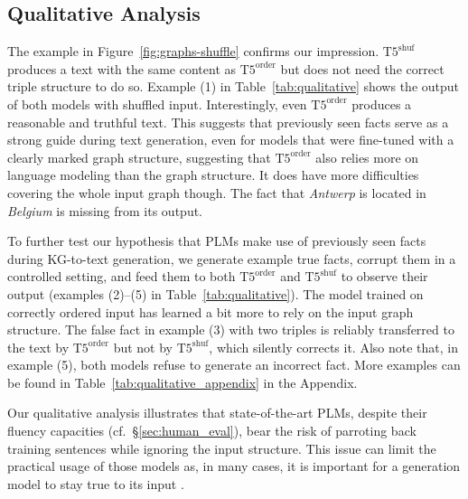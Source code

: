 \documentclass[11pt]{article}
\newcommand{\shufmodel}[3]{\ensuremath{\text{#1}^{\text{#3}}}}
\begin{document}
\subsection{Qualitative Analysis}
\label{sec:qualitative}

The example in Figure~\ref{fig:graphs-shuffle} confirms our impression.
\shufmodel{T5}{small}{shuf} produces a text with the same content as \shufmodel{T5}{small}{order} but does not need the correct triple structure to do so.
Example (1) in Table~\ref{tab:qualitative} shows the output of both models with shuffled input.
Interestingly, even \shufmodel{T5}{small}{order} produces a reasonable and truthful text.
This suggests that previously seen facts serve as a strong guide during text generation, even for models that were fine-tuned with a clearly marked graph structure,
suggesting that \shufmodel{T5}{small}{order} also relies more on language modeling than the graph structure.
It does have more difficulties covering the whole input graph though.
The fact that \emph{Antwerp} is located in \emph{Belgium} is missing from its output.

To further test our hypothesis that
PLMs make use of previously seen facts
during KG-to-text generation, we generate example true facts, corrupt them in a controlled setting, and feed them to both \shufmodel{T5}{small}{order} and \shufmodel{T5}{small}{shuf} to observe their output (examples (2)--(5) in Table~\ref{tab:qualitative}).
The model trained on correctly ordered input has learned a bit more to rely on the input graph structure. 
The false fact in example (3) with two triples is reliably transferred to the text by \shufmodel{T5}{small}{order} but not by \shufmodel{T5}{small}{shuf}, which silently corrects it.
Also note that, in example (5), both models refuse to generate an incorrect fact. More examples can be found in Table~\ref{tab:qualitative_appendix} in the Appendix.

Our qualitative analysis illustrates that state-of-the-art PLMs, despite their fluency capacities (cf.\ \S\ref{sec:human_eval}), bear the risk of parroting back training sentences while ignoring the input structure. This issue can limit the practical usage of those models as, in many cases, it is important for a generation model to stay true to its input \cite{wiseman-etal-2017-challenges, falke-etal-2019-ranking}.
\end{document}
